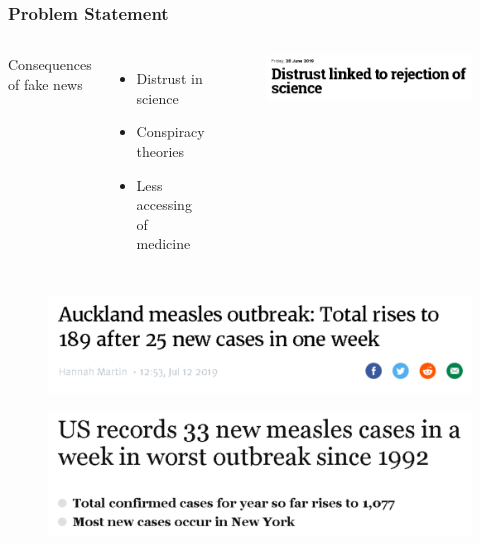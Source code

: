 \documentclass{beamer}
\begin{document}
\begin{frame}
	
		
		
		
\end{frame}


\begin{frame} \frametitle{Problem Statement}
\begin{columns}
		Consequences of fake news
	\begin{itemize}
			\item Distrust in science
			\item Conspiracy theories
			\item Less accessing of medicine
		\end{itemize}
		
\begin{figure}
		\includegraphics[scale=0.3,frame]{Figures/Distrust.pdf}
	\end{figure}
			\end{columns}
	\begin{figure}
		\includegraphics[scale=0.3,frame]{Figures/Vaccines_nz.pdf}
	\end{figure}
	\begin{figure}
		\includegraphics[scale=0.25,frame]{Figures/Vaccines_us.pdf}
	\end{figure}
\end{frame}
\end{document}
